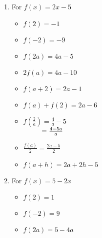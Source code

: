 \documentclass{ximera}
\begin{document}
\begin{enumerate}
\setcounter{enumi}{\value{HW}}

\item For $f(x) = 2x-5$

\begin{multicols}{3}
\begin{itemize}

\item  $f(2) = -1$
\item  $f(-2) = -9$
\item  $f(2a) = 4a-5$

\end{itemize}
\end{multicols}

\begin{multicols}{3}
\begin{itemize}

\item  $2 f(a) = 4a-10$
\item $f(a+2) = 2a-1$
\item $f(a) + f(2) = 2a-6$

\end{itemize}
\end{multicols}

\begin{multicols}{3}
\begin{itemize}

\item  $f \left( \frac{2}{a} \right) = \frac{4}{a} - 5$ \\
$\hphantom{f \left( \frac{2}{a} \right)} = \frac{4-5a}{a}$

\vfill

\columnbreak

\item $\frac{f(a)}{2} =\frac{2a-5}{2}$

\vfill

\columnbreak


\item  $f(a + h) = 2a + 2h - 5$

\end{itemize}
\end{multicols}

\item For $f(x) = 5-2x$

\begin{multicols}{3}
\begin{itemize}

\item  $f(2) = 1$
\item  $f(-2) = 9$
\item  $f(2a) = 5-4a$


\end{itemize}
\end{multicols}
\end{enumerate}
\end{document}
